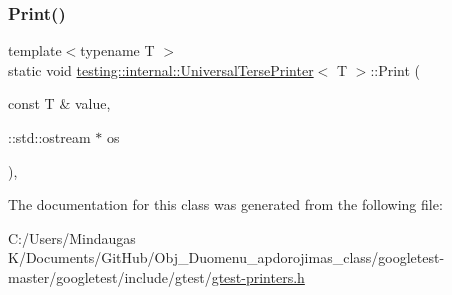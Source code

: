 \subsubsection{\texorpdfstring{Print()}{Print()}\hspace{0.1cm}{\footnotesize\ttfamily [3/3]}}
{\footnotesize\ttfamily template$<$typename T $>$ \\
static void \mbox{\hyperlink{classtesting_1_1internal_1_1_universal_terse_printer}{testing\+::internal\+::\+Universal\+Terse\+Printer}}$<$ T $>$\+::Print (\begin{DoxyParamCaption}\item[{const T \&}]{value,  }\item[{\+::std\+::ostream $\ast$}]{os }\end{DoxyParamCaption})\hspace{0.3cm}{\ttfamily [inline]}, {\ttfamily [static]}}



The documentation for this class was generated from the following file\+:\begin{DoxyCompactItemize}
\item 
C\+:/\+Users/\+Mindaugas K/\+Documents/\+Git\+Hub/\+Obj\+\_\+\+Duomenu\+\_\+apdorojimas\+\_\+class/googletest-\/master/googletest/include/gtest/\mbox{\hyperlink{googletest-master_2googletest_2include_2gtest_2gtest-printers_8h}{gtest-\/printers.\+h}}\end{DoxyCompactItemize}
